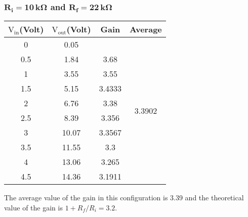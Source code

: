 \documentclass[12pt]{article}
\begin{document}
\subsubsection{$\mathbf{R_i = 10\, k \Omega}$ and $\mathbf{R_f = 22\, k \Omega}$}
\begin{table}[H]
	\centering
	\begin{tabular}{|c|c|c|c|}
		\hline
		$\mathrm{V_{in}}$(Volt) & $\mathrm{V_{out}}$(Volt) & Gain             & Average                            \\ \hline \hline
		0            & 0.05          &        & \multirow{10}{*}{3.3902} \\ \cline{1-3}
		0.5          & 1.84          & 3.68   &                          \\ \cline{1-3}
		1            & 3.55          & 3.55   &                          \\ \cline{1-3}
		1.5          & 5.15          & 3.4333 &                          \\ \cline{1-3}
		2            & 6.76          & 3.38   &                          \\ \cline{1-3}
		2.5          & 8.39          & 3.356  &                          \\ \cline{1-3}
		3            & 10.07         & 3.3567 &                          \\ \cline{1-3}
		3.5          & 11.55         & 3.3    &                          \\ \cline{1-3}
		4            & 13.06         & 3.265  &                          \\ \cline{1-3}
		4.5          & 14.36         & 3.1911 &                          \\ \hline
	\end{tabular}
\end{table}
The average value of the gain in this configuration is 3.39 and the theoretical value of the gain is $ 1 + R_f/R_i = 3.2 $. 
\end{document}
